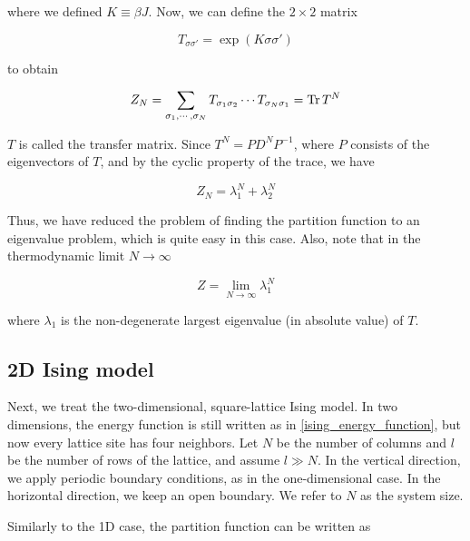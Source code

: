 where we defined $K \equiv \beta J$. Now, we can define
the $2 \times 2$ matrix

\begin{equation}\label{eq:transfer_matrix_1d_ising}
  T_{\sigma \sigma'} = \exp(K \sigma \sigma')
\end{equation}

to obtain

\begin{equation}
  Z_N = \sum_{\sigma_1, \cdots, \sigma_N} T_{\sigma_1 \sigma_2} \dotsm T_{\sigma_N \sigma_1} = \operatorname{Tr} T^N
\end{equation}

$T$ is called the transfer matrix. Since $T^N = P D^N P^{-1}$, where $P$
consists of the eigenvectors of $T$, and by the cyclic property of the trace, we
have

\begin{equation}
  Z_N = \lambda_{1}^{N} + \lambda_{2}^{N}
\end{equation}

Thus, we have reduced the problem of finding the partition function to an
eigenvalue problem, which is quite easy in this case. Also, note that in the thermodynamic limit $N \to \infty$

\begin{equation}
  Z = \lim_{N \to \infty} \lambda_{1}^{N}
\end{equation}

where $\lambda_1$ is the non-degenerate largest eigenvalue (in absolute value) of $T$.

\subsection{2D Ising model}

Next, we treat the two-dimensional, square-lattice Ising model. In two
dimensions, the energy function is still written as in
\eqref{ising_energy_function}, but now every lattice site has four neighbors.
Let $N$ be the number of columns and $l$ be the number of rows of the lattice, and assume
$l \gg N$. In the vertical direction, we apply periodic boundary conditions, as in the one-dimensional case.
In the horizontal direction, we keep an open boundary. We refer to $N$ as the system size.

Similarly to the 1D case, the partition function can be written as

